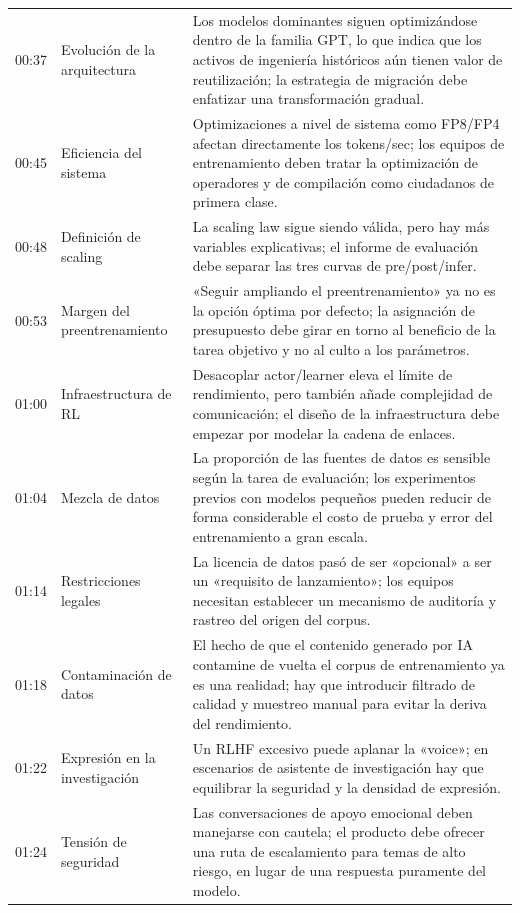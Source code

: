 \documentclass[a4paper]{article}
\begin{document}
\begin{longtable}{p{}p{}p{}}
00:37 & Evolución de la arquitectura & Los modelos dominantes siguen optimizándose dentro de la familia GPT, lo que indica que los activos de ingeniería históricos aún tienen valor de reutilización; la estrategia de migración debe enfatizar una transformación gradual. \\
00:45 & Eficiencia del sistema & Optimizaciones a nivel de sistema como FP8/FP4 afectan directamente los tokens/sec; los equipos de entrenamiento deben tratar la optimización de operadores y de compilación como ciudadanos de primera clase. \\
00:48 & Definición de scaling & La scaling law sigue siendo válida, pero hay más variables explicativas; el informe de evaluación debe separar las tres curvas de pre/post/infer. \\
00:53 & Margen del preentrenamiento & «Seguir ampliando el preentrenamiento» ya no es la opción óptima por defecto; la asignación de presupuesto debe girar en torno al beneficio de la tarea objetivo y no al culto a los parámetros. \\
01:00 & Infraestructura de RL & Desacoplar actor/learner eleva el límite de rendimiento, pero también añade complejidad de comunicación; el diseño de la infraestructura debe empezar por modelar la cadena de enlaces. \\
01:04 & Mezcla de datos & La proporción de las fuentes de datos es sensible según la tarea de evaluación; los experimentos previos con modelos pequeños pueden reducir de forma considerable el costo de prueba y error del entrenamiento a gran escala. \\
01:14 & Restricciones legales & La licencia de datos pasó de ser «opcional» a ser un «requisito de lanzamiento»; los equipos necesitan establecer un mecanismo de auditoría y rastreo del origen del corpus. \\
01:18 & Contaminación de datos & El hecho de que el contenido generado por IA contamine de vuelta el corpus de entrenamiento ya es una realidad; hay que introducir filtrado de calidad y muestreo manual para evitar la deriva del rendimiento. \\
01:22 & Expresión en la investigación & Un RLHF excesivo puede aplanar la «voice»; en escenarios de asistente de investigación hay que equilibrar la seguridad y la densidad de expresión. \\
01:24 & Tensión de seguridad & Las conversaciones de apoyo emocional deben manejarse con cautela; el producto debe ofrecer una ruta de escalamiento para temas de alto riesgo, en lugar de una respuesta puramente del modelo. \\

\end{longtable}
\end{document}
